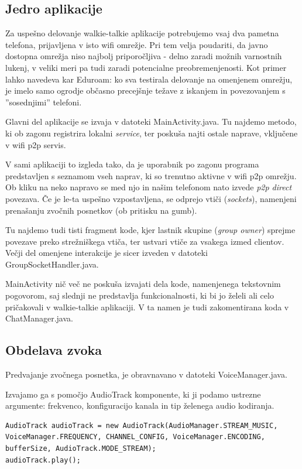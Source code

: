\documentclass[11pt,a4paper,slovene]{article}
\begin{document}
\subsection{Jedro aplikacije}
Za uspešno delovanje walkie-talkie aplikacije potrebujemo vsaj dva pametna telefona, prijavljena v isto wifi omrežje. Pri tem velja poudariti, da javno dostopna omrežja niso najbolj priporočljiva - delno zaradi možnih varnostnih lukenj, v veliki meri pa tudi zaradi potencialne preobremenjenosti. Kot primer lahko navedeva kar Eduroam: ko sva testirala delovanje na omenjenem omrežju, je imelo samo ogrodje občasno precejšnje težave z iskanjem in povezovanjem s ''sosednjimi'' telefoni.

Glavni del aplikacije se izvaja v datoteki MainActivity.java. Tu najdemo metodo, ki ob zagonu registrira lokalni \textit{service}, ter poskuša najti ostale naprave, vključene v wifi p2p servis. 

V sami aplikaciji to izgleda tako, da je uporabnik po zagonu programa predstavljen s seznamom vseh naprav, ki so trenutno aktivne v wifi p2p omrežju. Ob kliku na neko napravo se med njo in našim telefonom nato izvede \textit{p2p direct} povezava. Če je le-ta uspešno vzpostavljena, se odprejo vtiči (\textit{sockets}), namenjeni prenašanju zvočnih posnetkov (ob pritisku na gumb).

Tu najdemo tudi tisti fragment kode, kjer lastnik skupine (\textit{group owner}) sprejme povezave preko strežniškega vtiča, ter ustvari vtiče za vsakega izmed clientov. Večji del omenjene interakcije je sicer izveden v datoteki GroupSocketHandler.java.

\pagebreak
MainActivity nič več ne poskuša izvajati dela kode, namenjenega tekstovnim pogovorom, saj slednji ne predstavlja funkcionalnosti, ki bi jo želeli ali celo pričakovali v walkie-talkie aplikaciji. V ta namen je tudi zakomentirana koda v ChatManager.java.

\subsection{Obdelava zvoka}
Predvajanje zvočnega posnetka, je obravnavano v datoteki VoiceManager.java.

Izvajamo ga s pomočjo AudioTrack komponente, ki ji podamo ustrezne argumente: frekvenco, konfiguracijo kanala in tip želenega audio kodiranja.
\begin{verbatim}
AudioTrack audioTrack = new AudioTrack(AudioManager.STREAM_MUSIC,
VoiceManager.FREQUENCY, CHANNEL_CONFIG, VoiceManager.ENCODING, 
bufferSize, AudioTrack.MODE_STREAM);
audioTrack.play();

\end{verbatim}
\end{document}
